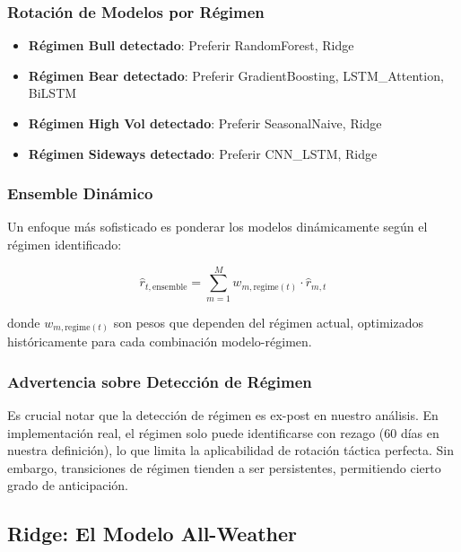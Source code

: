 \subsubsection{Rotaci\'on de Modelos por R\'egimen}

\begin{itemize}
    \item \textbf{R\'egimen Bull detectado}: Preferir RandomForest, Ridge
    \item \textbf{R\'egimen Bear detectado}: Preferir GradientBoosting, LSTM\_Attention, BiLSTM
    \item \textbf{R\'egimen High Vol detectado}: Preferir SeasonalNaive, Ridge
    \item \textbf{R\'egimen Sideways detectado}: Preferir CNN\_LSTM, Ridge
\end{itemize}

\subsubsection{Ensemble Din\'amico}

Un enfoque m\'as sofisticado es ponderar los modelos din\'amicamente seg\'un el r\'egimen identificado:

\begin{equation}
\hat{r}_{t,\text{ensemble}} = \sum_{m=1}^{M} w_{m,\text{regime}(t)} \cdot \hat{r}_{m,t}
\end{equation}

donde $w_{m,\text{regime}(t)}$ son pesos que dependen del r\'egimen actual, optimizados hist\'oricamente para cada combinaci\'on modelo-r\'egimen.

\subsubsection{Advertencia sobre Detecci\'on de R\'egimen}

Es crucial notar que la detecci\'on de r\'egimen es ex-post en nuestro an\'alisis. En implementaci\'on real, el r\'egimen solo puede identificarse con rezago (60 d\'ias en nuestra definici\'on), lo que limita la aplicabilidad de rotaci\'on t\'actica perfecta. Sin embargo, transiciones de r\'egimen tienden a ser persistentes, permitiendo cierto grado de anticipaci\'on.

\subsection{Ridge: El Modelo All-Weather}
\label{subsec:ridge_all_weather}

